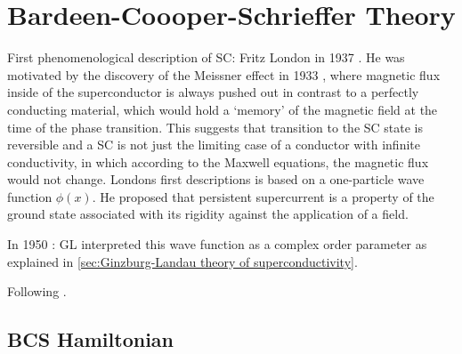 \documentclass[../notes.tex]{subfiles}
\begin{document}
\section{Bardeen-Coooper-Schrieffer Theory}\label{sec:bcs-theory}

First phenomenological description of SC: Fritz London in 1937 \cite{londonNewConceptionSupraconductivity1937}.
He was motivated by the discovery of the Meissner effect in 1933 \cite{meissnerNeuerEffektBei1933}, where magnetic flux inside of the superconductor is always pushed out in contrast to a perfectly conducting material, which would hold a `memory' of the magnetic field at the time of the phase transition. 
This suggests that transition to the SC state is reversible and a SC is not just the limiting case of a conductor with infinite conductivity, in which according to the Maxwell equations, the magnetic flux would not change.
Londons first descriptions is based on a one-particle wave function \(\phi (x)\).
He proposed that persistent supercurrent is a property of the ground state associated with its rigidity against the application of a field.

In 1950 \cite{ginzburgTheorySuperconductivity1950}: GL interpreted this wave function as a complex order parameter as explained in \cref{sec:Ginzburg-Landau theory of superconductivity}.

Following \cite[ch. 14]{colemanIntroductionManyBodyPhysics2015}.

\subsection{BCS Hamiltonian}
\end{document}
